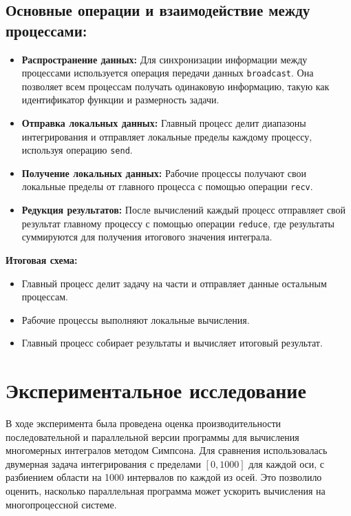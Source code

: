 \documentclass{report}
\begin{document}
\subsection*{Основные операции и взаимодействие между процессами:}
\begin{itemize}
    \item \textbf{Распространение данных:} Для синхронизации информации между процессами используется операция передачи данных \texttt{broadcast}. Она позволяет всем процессам получать одинаковую информацию, такую как идентификатор функции и размерность задачи.
    \item \textbf{Отправка локальных данных:} Главный процесс делит диапазоны интегрирования и отправляет локальные пределы каждому процессу, используя операцию \texttt{send}.
    \item \textbf{Получение локальных данных:} Рабочие процессы получают свои локальные пределы от главного процесса с помощью операции \texttt{recv}.
    \item \textbf{Редукция результатов:} После вычислений каждый процесс отправляет свой результат главному процессу с помощью операции \texttt{reduce}, где результаты суммируются для получения итогового значения интеграла.
\end{itemize}

\noindent \textbf{Итоговая схема:} 
\begin{itemize}
    \item Главный процесс делит задачу на части и отправляет данные остальным процессам.
    \item Рабочие процессы выполняют локальные вычисления.
    \item Главный процесс собирает результаты и вычисляет итоговый результат.
\end{itemize} 

\newpage
\section*{Экспериментальное исследование}

В ходе эксперимента была проведена оценка производительности последовательной и параллельной версии программы для вычисления многомерных интегралов методом Симпсона. Для сравнения использовалась двумерная задача интегрирования с пределами \([0, 1000]\) для каждой оси, с разбиением области на 1000 интервалов по каждой из осей. Это позволило оценить, насколько параллельная программа может ускорить вычисления на многопроцессной системе.
\end{document}
